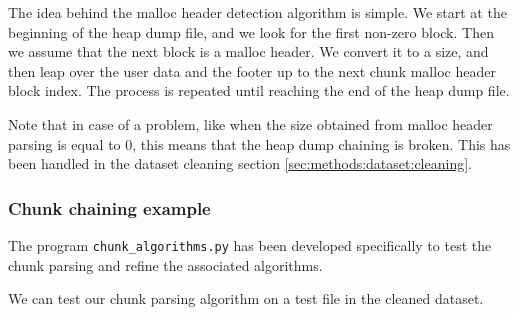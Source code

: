     The idea behind the malloc header detection algorithm is simple. We start at the beginning of the heap dump file, and we look for the first non-zero block. Then we assume that the next block is a malloc header. We convert it to a size, and then leap over the user data and the footer up to the next chunk malloc header block index. The process is repeated until reaching the end of the heap dump file.

    Note that in case of a problem, like when the size obtained from malloc header parsing is equal to 0, this means that the heap dump chaining is broken. This has been handled in the dataset cleaning section \ref{sec:methods:dataset:cleaning}. 

    \subsubsection{Chunk chaining example}
    The program \texttt{chunk\_algorithms.py} has been developed specifically to test the chunk parsing and refine the associated algorithms.

    We can test our chunk parsing algorithm on a test file in the cleaned dataset.

